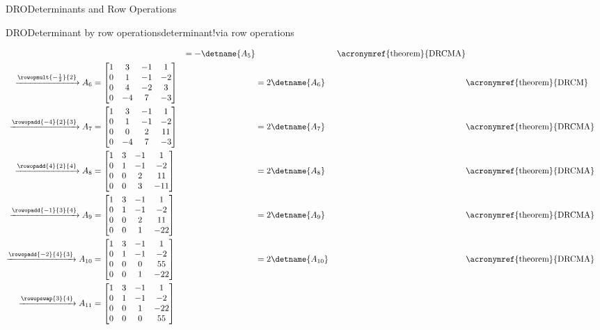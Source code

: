 \begin{subsect}{DRO}{Determinants and Row Operations}
\begin{example}{DRO}{Determinant by row operations}{determinant!via row operations}
\begin{para}
\begin{align*}
&
&=-\detname{A_5}&&\text{\acronymref{theorem}{DRCMA}}\\
%
\xrightarrow{\rowopmult{-\frac{1}{2}}{2}}
A_6&=
\begin{bmatrix}
1 & 3 &-1 & 1 \\
0 & 1 &-1 &-2 \\
0 & 4 &-2 & 3 \\
0 &-4 & 7 &-3
\end{bmatrix}
&
&=2\detname{A_6}&&\text{\acronymref{theorem}{DRCM}}\\
%
\xrightarrow{\rowopadd{-4}{2}{3}}
A_7&=
\begin{bmatrix}
1 & 3 &-1 & 1 \\
0 & 1 &-1 &-2 \\
0 & 0 & 2 &11 \\
0 &-4 & 7 &-3
\end{bmatrix}
&
&=2\detname{A_7}&&\text{\acronymref{theorem}{DRCMA}}\\
%
\xrightarrow{\rowopadd{4}{2}{4}}
A_8&=
\begin{bmatrix}
1 & 3 &-1 & 1 \\
0 & 1 &-1 &-2 \\
0 & 0 & 2 &11 \\
0 & 0 & 3 &-11
\end{bmatrix}
&
&=2\detname{A_8}&&\text{\acronymref{theorem}{DRCMA}}\\
%
\xrightarrow{\rowopadd{-1}{3}{4}}
A_9&=
\begin{bmatrix}
1 & 3 &-1 & 1 \\
0 & 1 &-1 &-2 \\
0 & 0 & 2 &11 \\
0 & 0 & 1 &-22
\end{bmatrix}
&
&=2\detname{A_9}&&\text{\acronymref{theorem}{DRCMA}}\\
%
\xrightarrow{\rowopadd{-2}{4}{3}}
A_{10}&=
\begin{bmatrix}
1 & 3 &-1 & 1 \\
0 & 1 &-1 &-2 \\
0 & 0 & 0 &55 \\
0 & 0 & 1 &-22
\end{bmatrix}
&
&=2\detname{A_{10}}&&\text{\acronymref{theorem}{DRCMA}}\\
%
\xrightarrow{\rowopswap{3}{4}}
A_{11}&=
\begin{bmatrix}
1 & 3 &-1 & 1 \\
0 & 1 &-1 &-2 \\
0 & 0 & 1 &-22\\
0 & 0 & 0 &55
\end{bmatrix}

\end{align*}
\end{para}
\end{example}
\end{subsect}
